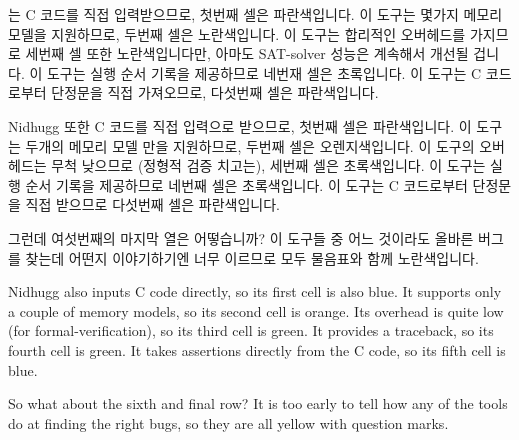  는 C 코드를 직접 입력받으므로, 첫번째 셀은 파란색입니다.
이 도구는 몇가지 메모리 모델을 지원하므로, 두번째 셀은 노란색입니다.
이 도구는 합리적인 오버헤드를 가지므로 세번째 셀 또한 노란색입니다만, 아마도
SAT-solver 성능은 계속해서 개선될 겁니다.
이 도구는 실행 순서 기록을 제공하므로 네번재 셀은 초록입니다.
이 도구는 C 코드로부터 단정문을 직접 가져오므로, 다섯번째 셀은 파란색입니다.

\iffalse

The \co{herd} tool has size restrictions similar to those of PPCMEM,
so \co{herd}'s first cell is also orange.
It supports a wide variety of memory models, so its second cell is blue.
It has reasonable overhead, so its third cell is yellow.
Its bug-location and assertion capabilities are quite similar to those
of PPCMEM, so \co{herd} also gets yellow for the next two cells.

The \co{cbmc} tool inputs C code directly, so its first cell is blue.
It supports a few memory models, so its second cell is yellow.
It has reasonable overhead, so its third cell is also yellow, however,
perhaps SAT-solver performance will continue improving.
It provides a traceback, so its fourth cell is green.
It takes assertions directly from the C code, so its fifth cell is blue.

\fi

Nidhugg 또한 C 코드를 직접 입력으로 받으므로, 첫번째 셀은 파란색입니다.
이 도구는 두개의 메모리 모델 만을 지원하므로, 두번째 셀은 오렌지색입니다.
이 도구의 오버헤드는 무척 낮으므로 (정형적 검증 치고는), 세번째 셀은
초록색입니다.
이 도구는 실행 순서 기록을 제공하므로 네번째 셀은 초록색입니다.
이 도구는 C 코드로부터 단정문을 직접 받으므로 다섯번째 셀은 파란색입니다.

그런데 여섯번째의 마지막 열은 어떻습니까?
이 도구들 중 어느 것이라도 올바른 버그를 찾는데 어떤지 이야기하기엔 너무
이르므로 모두 물음표와 함께 노란색입니다.

\iffalse

Nidhugg also inputs C code directly, so its first cell is also blue.
It supports only a couple of memory models, so its second cell is orange.
Its overhead is quite low (for formal-verification), so its
third cell is green.
It provides a traceback, so its fourth cell is green.
It takes assertions directly from the C code, so its fifth cell is blue.

So what about the sixth and final row?
It is too early to tell how any of the tools do at finding the right bugs,
so they are all yellow with question marks.

